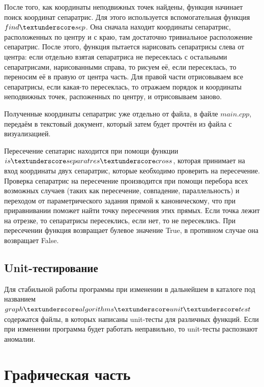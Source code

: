	\par После того, как координаты неподвижных точек найдены, функция начинает поиск координат сепаратрис. Для этого используется вспомогательная функция $find \textunderscore sep$. Она сначала находит координаты сепаратрис, расположенных по центру и с краю, там достаточно тривиальное расположение сепаратрис. После этого, функция пытается нарисовать сепаратрисы слева от центра: если отдельно взятая сепаратриса не пересеклась с остальными сепаратрисами, нарисованными справа, то рисуем её, если пересеклась, то переносим её в правую от центра часть. Для правой части отрисовываем все сепаратрисы, если какая-то пересеклась, то отражаем порядок и координаты неподвижных точек, распоженных по центру, и отрисовываем заново.
	\par Полученные координаты сепаратрис уже отдельно от файла, в файле $main.cpp$, передаём в текстовый документ, который затем будет прочтён из файла с визуализацией.
	\par Пересечение сепатарис находится при помощи функции $is \textunderscore separatres \textunderscore cross$, которая принимает на вход координаты двух сепаратрис, которые кеобходимо проверить на пересечение. Проверка сепаратрис на пересечение производится при помощи перебора всех возможных случаев (таких как пересечение, совпадение, параллельность) и переходом от параметрического задания прямой к каноническому, что при приравнивании поможет найти точку пересечения этих прямых. Если точка лежит на отрезке, то сепаратрисы пересеклись, если нет, то не пересеклись. При пересечении функция возвращает булевое значение True, в противном случае она возвращает False.
	\subsection{Unit-тестирование}
	\hspace{0.5 cm} Для стабильной работы программы при изменении в дальнейшем в каталоге под названием $graph \textunderscore algorithms \textunderscore unit \textunderscore test$ содержатся файлы, в которых написаны unit-тесты для различных функций. Если при изменении программа будет работать неправильно, то unit-тесты распознают аномалии.
	\newpage
	\section{Графическая часть}
